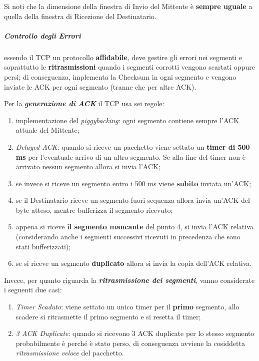 \documentclass[a4paper]{article}
\begin{document}
						Si noti che la dimensione della finestra di Invio del Mittente è \textbf{sempre uguale} a quella della finestra di Ricezione del Destinatario.
						
					\subparagraph{Controllo degli Errori}
						essendo il TCP un protocollo \textbf{affidabile}, deve gestire gli errori nei segmenti e soprattutto le \textbf{ritrasmissioni} quando i segmenti corrotti vengono scartati oppure persi; di conseguenza, implementa la Checksum in ogni segmento e vengono inviate le ACK per ogni segmento (tranne che per altre ACK).
						
						Per la \textbf{\emph{generazione di ACK}} il TCP usa sei regole:
						\begin{enumerate}
							\item implementazione del \emph{piggybacking}: ogni segmento contiene sempre l'ACK attuale del Mittente;
							\item \emph{Delayed ACK}: quando si riceve un pacchetto viene settato un \textbf{timer di 500 ms} per l'eventuale arrivo di un altro segmento. Se alla fine del timer non è arrivato nessun segmento allora si invia l'ACK;
							\item se invece si riceve un segmento entro i 500 ms viene \textbf{subito} inviata un'ACK;
							\item se il Destinatario riceve un segmento fuori sequenza allora invia un'ACK del byte atteso, mentre bufferizza il segmento ricevuto;
							\item appena si riceve \textbf{il segmento mancante} del punto 4, si invia l'ACK relativa (considerando anche i segmenti successivi ricevuti in precedenza che sono stati bufferizzati);
							\item se si riceve un segmento \textbf{duplicato} allora si invia la copia dell'ACK relativa.
						\end{enumerate}
							
						Invece, per quanto riguarda la \textbf{\emph{ritrasmissione dei segmenti}}, vanno considerate i seguenti due casi:
						\begin{enumerate}
							\item \emph{Timer Scaduto}: viene settato un unico timer per il \textbf{primo} segmento, allo scadere si ritrasmette il primo segmento e si resetta il timer;
							\item \emph{3 ACK Duplicate}: quando si ricevono 3 ACK duplicate per lo stesso segmento probabilmente è perché è stato perso, di conseguenza avviene la cosiddetta \emph{ritrasmissione veloce} del pacchetto.
						\end{enumerate}
					
\end{document}
